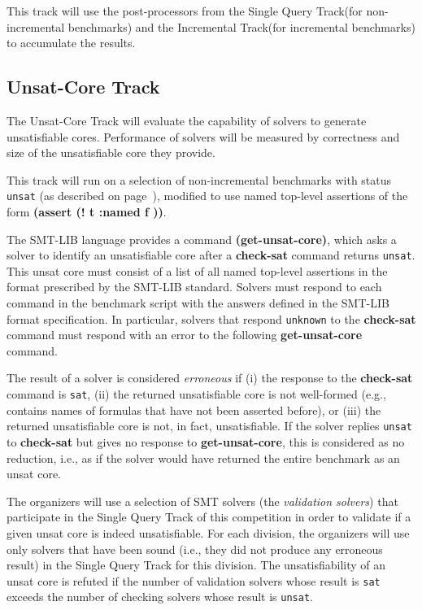 \documentclass[12pt]{article}
\newcommand{\akey}[1]{\textbf{#1}\xspace}
\newcommand{\maintrack}{Single Query Track\xspace}
\newcommand{\inctrack}{Incremental Track\xspace}
\newcommand{\ucoretrack}{Unsat-Core Track\xspace}
\begin{document}
This track will use the post-processors from the \maintrack (for
non-incremen\-tal benchmarks) and the \inctrack (for incremental benchmarks)
to accumulate the results.

\subsection{\ucoretrack}
\label{sec:exec:unsat-core}

The \ucoretrack will evaluate the capability of solvers to generate
unsatisfiable cores.  Performance of solvers will be measured by correctness
and size of the unsatisfiable core they provide.

This track will run on a selection of non-incremental benchmarks with status
\texttt{unsat} (as described on page~\pageref{benchmark-selection}), modified
to use named top-level assertions of the form \akey{(assert (! t :named f ))}.


The SMT-LIB language provides a command \akey{(get-unsat-core)}, which asks
a solver to identify an unsatisfiable core after a \akey{check-sat}
command returns \texttt{unsat}.
This unsat core must consist of a list of all named top-level
assertions in the format prescribed by the SMT-LIB standard.
%
Solvers must respond to each command in the benchmark script with the
answers defined in the SMT-LIB format specification.  In particular,
solvers that respond \texttt{unknown} to the \akey{check-sat} command
must respond with an error to the following \akey{get-unsat-core}
command.

The result of a solver is considered \emph{erroneous} if (i) the
response to the \akey{check-sat} command is \texttt{sat}, (ii) the
returned unsatisfiable core is not well-formed (e.g., contains names of
formulas that have not been asserted before), or (iii) the returned
unsatisfiable core is not, in fact, unsatisfiable.
%
If the solver replies \texttt{unsat} to \akey{check-sat} but gives no
response to \akey{get-unsat-core}, this is considered as no reduction, i.e.,
as if the solver would have returned the entire benchmark as an unsat
core.

The organizers will use a selection of SMT solvers (the \emph{validation
solvers}) that participate in the \maintrack of this competition in order to
validate if a given unsat core is indeed unsatisfiable.  For each division, the
organizers will use only solvers that have been sound (i.e., they did not
produce any erroneous result) in the \maintrack for this division.  The
unsatisfiability of an unsat core is refuted if the number of validation
solvers whose result is \texttt{sat} exceeds the number of checking solvers
whose result is \texttt{unsat}.
\end{document}
